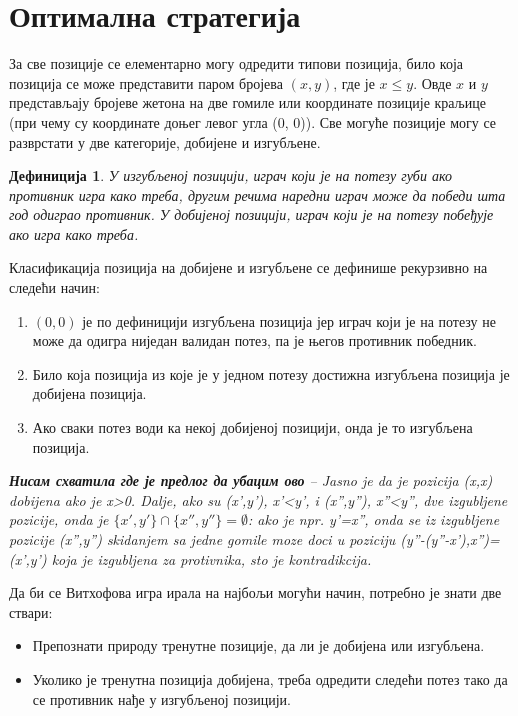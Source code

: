 \documentclass[a4paper]{article}
\newtheorem{definition}{Дефиниција}
\begin{document}
\section{Оптимална стратегија}
\label{sec:optimalna_strategija}

За све позиције се елементарно могу одредити типови позиција, било која позиција се може представити паром бројева $ (x, y) $, где је $ x \le  y $. Овде  $ x $ и $ y $ представљају бројеве жетона на две гомиле или координате позиције краљице (при чему су координате доњег левог угла (0, 0)). Све могуће позиције могу се разврстати у две категорије, добијене и изгубљене. 

\begin{definition}
	У изгубљеној позицији, играч који је на потезу губи ако противник игра како треба, другим речима наредни играч може да победи шта год одиграо противник. У добијеној позицији, играч који је на потезу побеђује ако игра како треба.
\end{definition}

Класификација позиција на добијене и изгубљене се дефинише рекурзивно на следећи начин:
\begin{enumerate}
	\item $ (0, 0) $ је по дефиницији изгубљена позиција јер играч који је на потезу не може да одигра ниједан валидан потез, па је његов противник победник.
	\item Било која позиција из које је у једном потезу достижна изгубљена позиција је добијена позиција.
	\item Ако сваки потез води ка некој добијеној позицији, онда је то изгубљена позиција.
\end{enumerate}

\textit{\textbf{Нисам схватила где је предлог да убацим ово} -- Jasno je da je pozicija (x,x) dobijena ako je x>0. Dalje,  ako su (x',y'), x'<y', i (x'',y''), x''<y'', dve izgubljene pozicije, onda je $\{x',y'\} \cap   \{x'',y''\}= \emptyset $:
ako je npr. y'=x'', onda se iz izgubljene pozicije (x'',y'') skidanjem sa jedne gomile moze doci u poziciju
(y''-(y''-x'),x'')=(x',y') koja je izgubljena za protivnika, sto je kontradikcija.}

Да би се Витхофова игра ирала на најбољи могући начин, потребно је знати две ствари:
\begin{itemize}
	\item Препознати природу тренутне позиције, да ли је добијена или изгубљена.
	\item Уколико је тренутна позиција добијена, треба одредити следећи потез тако да се противник нађе у изгубљеној позицији.
\end{itemize}
\end{document}
